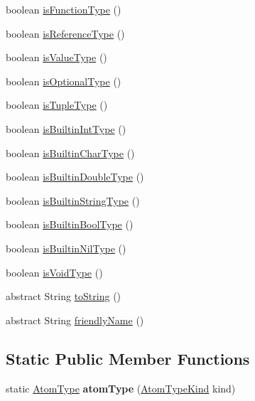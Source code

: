 \begin{DoxyCompactItemize}
\item 
boolean \hyperlink{classcompiler_1_1seman_1_1type_1_1_type_ac8930ee45884b8558f168ad9dafb35cd}{is\+Function\+Type} ()
\item 
boolean \hyperlink{classcompiler_1_1seman_1_1type_1_1_type_a4677fbc8456cb7124a8106c3279f456f}{is\+Reference\+Type} ()
\item 
boolean \hyperlink{classcompiler_1_1seman_1_1type_1_1_type_a5de47f51f57b582dbc7b334bc3c87bd1}{is\+Value\+Type} ()
\item 
boolean \hyperlink{classcompiler_1_1seman_1_1type_1_1_type_a6087e56ed1b2049aca78971bf1877dc9}{is\+Optional\+Type} ()
\item 
boolean \hyperlink{classcompiler_1_1seman_1_1type_1_1_type_a5c5b1565472411598045ad78512904dd}{is\+Tuple\+Type} ()
\item 
boolean \hyperlink{classcompiler_1_1seman_1_1type_1_1_type_a1d75663185d1587c5071a30707786406}{is\+Builtin\+Int\+Type} ()
\item 
boolean \hyperlink{classcompiler_1_1seman_1_1type_1_1_type_af50d2295a7d1d3083631f58d30d2312a}{is\+Builtin\+Char\+Type} ()
\item 
boolean \hyperlink{classcompiler_1_1seman_1_1type_1_1_type_a615beef2ebd01cc0bc817b4505c90401}{is\+Builtin\+Double\+Type} ()
\item 
boolean \hyperlink{classcompiler_1_1seman_1_1type_1_1_type_a30658a390537e2f3a6f6939b9c8442fb}{is\+Builtin\+String\+Type} ()
\item 
boolean \hyperlink{classcompiler_1_1seman_1_1type_1_1_type_a44c98ab1449e373ccd4d913465a7ebda}{is\+Builtin\+Bool\+Type} ()
\item 
boolean \hyperlink{classcompiler_1_1seman_1_1type_1_1_type_ac3c4b2f65b0623cbcd25f79c8f3f9d9b}{is\+Builtin\+Nil\+Type} ()
\item 
boolean \hyperlink{classcompiler_1_1seman_1_1type_1_1_type_a768c5b1b9b54689a15723c556a0e0733}{is\+Void\+Type} ()
\item 
abstract String \hyperlink{classcompiler_1_1seman_1_1type_1_1_type_a775a220851d5e37349cc93f64f482770}{to\+String} ()
\item 
abstract String \hyperlink{classcompiler_1_1seman_1_1type_1_1_type_a10c3230bf454e5ea2fd8b63953fca9fc}{friendly\+Name} ()
\end{DoxyCompactItemize}
\subsection*{Static Public Member Functions}
\begin{DoxyCompactItemize}
\item 
\mbox{\label{classcompiler_1_1seman_1_1type_1_1_type_a75ac0d6800aed51e054d60a053f4105f}} 
static \hyperlink{classcompiler_1_1seman_1_1type_1_1_atom_type}{Atom\+Type} {\bfseries atom\+Type} (\hyperlink{enumcompiler_1_1abstr_1_1tree_1_1_atom_type_kind}{Atom\+Type\+Kind} kind)
\end{DoxyCompactItemize}
